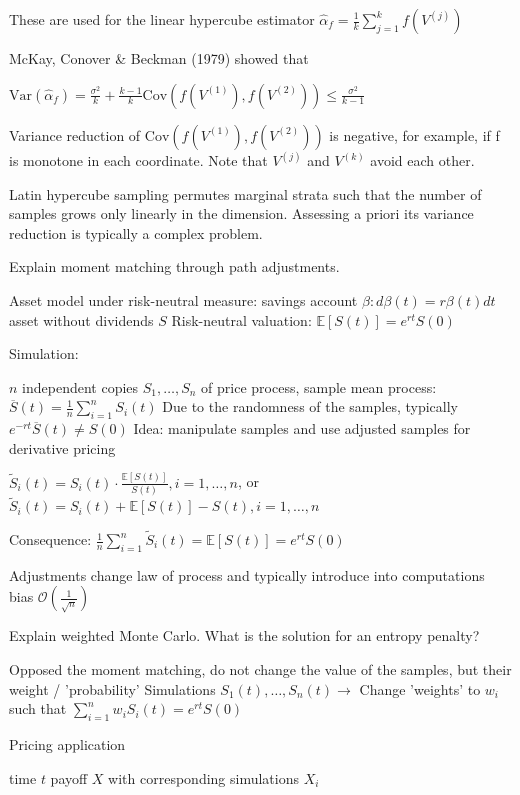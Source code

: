 These are used for the linear hypercube estimator \( \hat{\alpha}_f = \frac{1}{k} \sum_{j=1}^{k} f(V^{(j)}) \)

McKay, Conover & Beckman (1979) showed that

\( \text{Var}(\hat{\alpha}_f) = \frac{\sigma^2}{k} + \frac{k-1}{k} \text{Cov}(f(V^{(1)}), f(V^{(2)})) \leq \frac{\sigma^2}{k-1} \)

Variance reduction of \( \text{Cov}(f(V^{(1)}), f(V^{(2)})) \) is negative, for example, if f is monotone in each coordinate. Note that \( V^{(j)} \) and \(V^{(k)}\) 
avoid each other.

Latin hypercube sampling permutes marginal strata such that the number of samples grows only linearly in
the dimension.
Assessing a priori its variance reduction is typically a complex problem.

Explain moment matching through path adjustments.

Asset model under risk-neutral measure:
savings account \( \beta: d\beta(t) = r\beta(t) dt \)
asset without dividends \( S \)
Risk-neutral valuation: \( \mathbb{E}[S(t)] = e^{rt}S(0) \)

Simulation:

\( n \) independent copies \( S_1, \dots, S_n \) of price process, sample mean process: \( \overline{S}(t) = \frac{1}{n}\sum_{i=1}^{n}S_{i}(t) \)
Due to the randomness of the samples, typically \( e^{-rt}\overline{S}(t) \neq S(0) \)
Idea: manipulate samples and use adjusted samples for derivative pricing

\( \tilde{S}_i(t) = S_i(t) \cdot \frac{\mathbb{E}[S(t)]}{S(t)}, i = 1, \dots, n \), or
\( \tilde{S}_i(t) = S_i(t) + \mathbb{E}[S(t)] - S(t), i = 1,\dots, n \)

Consequence: \( \frac{1}{n}\sum_{i=1}^{n}\tilde{S}_i(t) = \mathbb{E}[S(t)] = e^{rt}S(0) \)

Adjustments change law of process and typically introduce into computations bias \( \mathcal{O}(\frac{1}{\sqrt{n}}) \)



Explain weighted Monte Carlo. What is the solution for an entropy penalty?

Opposed the moment matching, do not change the value of the samples, but their weight / 'probability'
Simulations \( S_1(t), \dots, S_n(t) \rightarrow \) Change 'weights' to \( w_i \) such that \( \sum_{i=1}^{n} w_i S_i(t) = e^{rt} S(0) \)

Pricing application

time \( t \) payoff \( X \) with corresponding simulations \( X_i \)

